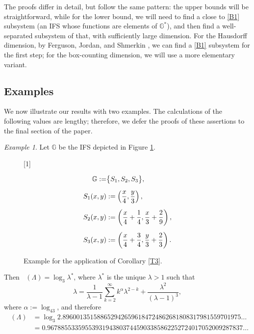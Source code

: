 \documentclass[a4paper, 11pt]{article}
\DeclareMathOperator{\dH}{\dim_{\mathrm{H}}}
\numberwithin{equation}{section}
\theoremstyle{plain}
\theoremstyle{remark}
\newtheorem{example}[theorem]{Example}
\theoremstyle{definition}
\begin{document}
The proofs differ in detail, but follow the same pattern: the upper bounds will be straightforward, while for the lower bound, we will need to find a close to \ref{B1} subsystem (an IFS whose functions are elements of $\mathbb{G}^*$), and then find a well-separated subsystem of that, with sufficiently large dimension. For the Hausdorff dimension, by Ferguson, Jordan, and Shmerkin \cite{ferguson2009hausdorffdimensionprojectionsselfaffine}, we can find a \ref{B1} subsystem for the first step; for the box-counting dimension, we will use a more elementary variant.

\subsection{Examples}

We now illustrate our results with two examples. The calculations of the following values are lengthy; therefore, we defer the proofs of these assertions to the final section of the paper.

\begin{example} \label{ex:1} Let $\mathbb{G}$ be the IFS depicted in Figure \ref{EF2}.

\begin{figure}[H]
	\centering
	\begin{minipage}{0.65\textwidth}
		\centering
		\scalebox{1}[1]{}
	\end{minipage}%
	\hfill
	\begin{minipage}{0.35\textwidth}
		\raggedright
		\begin{align*}
			\mathbb{G} := &\big\{S_1, S_2, S_3\big\}, \notag\\[6pt]
			S_1(x,y) &:=\left(\frac{x}{4},\frac{y}{3}\right), \notag\\[5pt]
			S_2(x,y) &:= \left(\frac{x}{4}+\frac14,\frac{x}{3}+\frac29\right), \notag\\[5pt]
			S_3(x,y) &:= \left(\frac{x}{4}+\frac34,\frac{y}{3}+\frac23\right). \notag
		\end{align*}
	\end{minipage}
	\caption{Example for the application of Corollary \ref{T3}.}
	\label{EF2}
\end{figure}
	
Then $\dH(\Lambda) = \log_3 \lambda^*$, where $\lambda^*$ is the unique $\lambda> 1$ such that
\begin{equation*}
\lambda = \frac{1}{\lambda-1}\sum_{k=2}^\infty k^\alpha \lambda^{2-k} + \frac{\lambda^2}{(\lambda-1)^3},
\end{equation*}
where $\alpha := \log_43$, and therefore
\begin{equation*}\begin{aligned}
\dH(\Lambda) &= \log_3 2.8960013515886529426596184724862681808317981559701975\dots \\
& = 0.967885533595539319438037445903385862252724017052009287837\dots
\end{aligned}\end{equation*}
\end{example}
\end{document}
